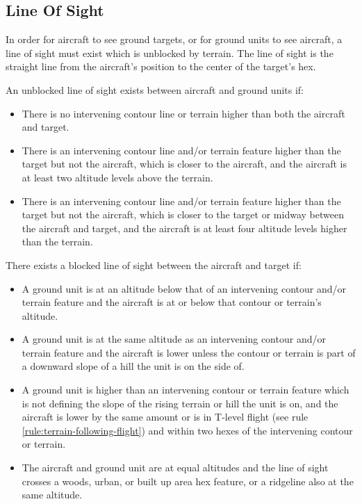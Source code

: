 \subsection{Line Of Sight}
\label{rule:line-of-sight}
In order for aircraft to see ground targets, or for ground units to see aircraft, a line of sight must exist which is unblocked by terrain. The line of sight is the straight line from the aircraft's position to the center of the target's hex.

An unblocked line of sight exists between aircraft and ground units if:

\begin{itemize}
    \item There is no intervening contour line or terrain higher than both the aircraft and target.
    \item There is an intervening contour line and/or terrain feature higher than the target but not the aircraft, which is closer to the aircraft, and the aircraft is at least two altitude levels above the terrain.
    \item There is an intervening contour line and/or terrain feature higher than the target but not the aircraft, which is closer to the target or midway between the aircraft and target, and the aircraft is at least four altitude levels higher than the terrain.
\end{itemize}

There exists a blocked line of sight between the aircraft and target if:

\begin{itemize}

    \item A ground unit is at an altitude below that of an intervening contour and/or terrain feature and the aircraft is at or below that contour or terrain's altitude.

    \item A ground unit is at the same altitude as an intervening contour and/or terrain feature and the aircraft is lower unless the contour or terrain is part of a downward slope of a hill the unit is on the side of.

    \item A ground unit is higher than an intervening contour or terrain feature which is not defining the slope of the rising terrain or hill the unit is on, and the aircraft is lower by the same amount or is in T-level flight (see rule \ref{rule:terrain-following-flight}) and within two hexes of the intervening contour or terrain.

    \item The aircraft and ground unit are at equal altitudes and the line of sight crosses a woods, urban, or built up area hex feature, or a ridgeline also at the same altitude.

\end{itemize}

